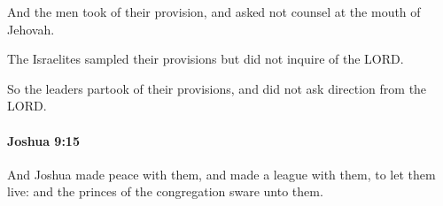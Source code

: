 			\begin{versebox}
					\item[BHS] 
					\item[ASV] And the men took of their provision, and asked not counsel at the mouth of Jehovah.
					\item[NIV] The Israelites sampled their provisions but did not inquire of the LORD.
					\item[NRSV] So the leaders partook of their provisions, and did not ask direction from the LORD.
			\end{versebox}

		\paragraph{Joshua 9:15} %
			\label{JOSHUA-9-15}

			And Joshua made peace with them, and made a league with them, to let them live: and the princes of the congregation sware unto them.

